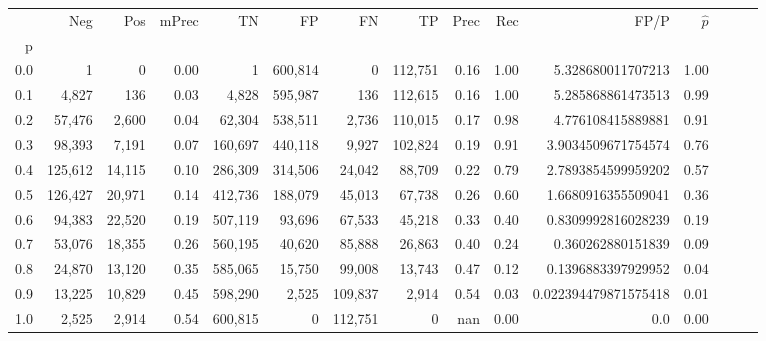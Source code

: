 \begin{tabular}{rrrrrrrrrrrrrrr}
\toprule
{} &      Neg &     Pos & mPrec &       TN &       FP &       FN &       TP &  Prec &   Rec &                  FP/P & $\hat{p}$ \\
p   &          &         &       &          &          &          &          &       &       &                       &           \\
\midrule
0.0 &        1 &       0 &  0.00 &        1 &  600,814 &        0 &  112,751 &  0.16 &  1.00 &     5.328680011707213 &      1.00 \\
0.1 &    4,827 &     136 &  0.03 &    4,828 &  595,987 &      136 &  112,615 &  0.16 &  1.00 &     5.285868861473513 &      0.99 \\
0.2 &   57,476 &   2,600 &  0.04 &   62,304 &  538,511 &    2,736 &  110,015 &  0.17 &  0.98 &     4.776108415889881 &      0.91 \\
0.3 &   98,393 &   7,191 &  0.07 &  160,697 &  440,118 &    9,927 &  102,824 &  0.19 &  0.91 &    3.9034509671754574 &      0.76 \\
0.4 &  125,612 &  14,115 &  0.10 &  286,309 &  314,506 &   24,042 &   88,709 &  0.22 &  0.79 &    2.7893854599959202 &      0.57 \\
0.5 &  126,427 &  20,971 &  0.14 &  412,736 &  188,079 &   45,013 &   67,738 &  0.26 &  0.60 &    1.6680916355509041 &      0.36 \\
0.6 &   94,383 &  22,520 &  0.19 &  507,119 &   93,696 &   67,533 &   45,218 &  0.33 &  0.40 &    0.8309992816028239 &      0.19 \\
0.7 &   53,076 &  18,355 &  0.26 &  560,195 &   40,620 &   85,888 &   26,863 &  0.40 &  0.24 &     0.360262880151839 &      0.09 \\
0.8 &   24,870 &  13,120 &  0.35 &  585,065 &   15,750 &   99,008 &   13,743 &  0.47 &  0.12 &    0.1396883397929952 &      0.04 \\
0.9 &   13,225 &  10,829 &  0.45 &  598,290 &    2,525 &  109,837 &    2,914 &  0.54 &  0.03 &  0.022394479871575418 &      0.01 \\
1.0 &    2,525 &   2,914 &  0.54 &  600,815 &        0 &  112,751 &        0 &   nan &  0.00 &                   0.0 &      0.00 \\
\bottomrule
\end{tabular}
